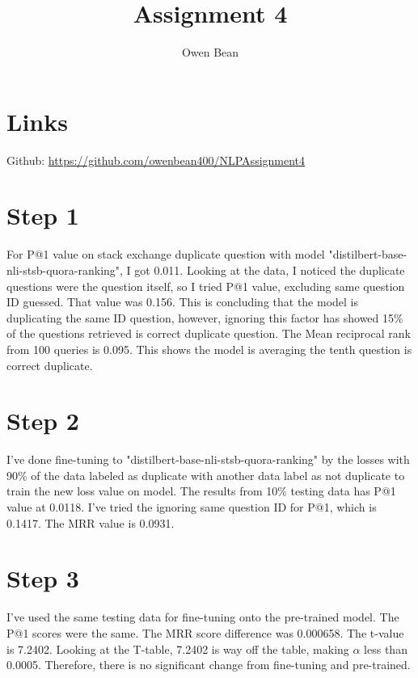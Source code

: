 \documentclass{article}
\title{Assignment 4}
\author{Owen Bean}
\begin{document}
\maketitle


\section{Links}

Github: \href{https://github.com/owenbean400/NLPAssignment4}{https://github.com/owenbean400/NLPAssignment4}

\section{Step 1}

For P@1 value on stack exchange duplicate question with model "distilbert-base-nli-stsb-quora-ranking", I got 0.011. Looking at the data, I noticed the duplicate questions were the question itself, so I tried P@1 value, excluding same question ID guessed. That value was 0.156. This is concluding that the model is duplicating the same ID question, however, ignoring this factor has showed 15\% of the questions retrieved is correct duplicate question. The Mean reciprocal rank from 100 queries is 0.095. This shows the model is averaging the tenth question is correct duplicate.

\section{Step 2}

I've done fine-tuning to "distilbert-base-nli-stsb-quora-ranking" by the losses with 90\% of the data labeled as duplicate with another data label as not duplicate to train the new loss value on model. The results from 10\% testing data has P@1 value at 0.0118. I've tried the ignoring same question ID for P@1, which is 0.1417. The MRR value is 0.0931.

\section{Step 3}

I've used the same testing data for fine-tuning onto the pre-trained model. The P@1 scores were the same. The MRR score difference was 0.000658. The t-value is 7.2402. Looking at the T-table, 7.2402 is way off the table, making \(\alpha\) less than 0.0005. Therefore, there is no significant change from fine-tuning and pre-trained.
\end{document}
